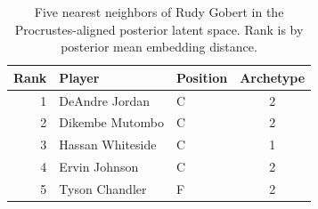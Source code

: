 \begin{table}[htbp]
  \centering\small
  \begin{tabular}{rllc}
    \toprule
    Rank & Player & Position & Archetype \\
    \midrule
    1 & DeAndre Jordan & C & 2 \\
    2 & Dikembe Mutombo & C & 2 \\
    3 & Hassan Whiteside & C & 1 \\
    4 & Ervin Johnson & C & 2 \\
    5 & Tyson Chandler & F & 2 \\
    \bottomrule
  \end{tabular}
  \caption{Five nearest neighbors of Rudy Gobert in the Procrustes-aligned posterior latent space. Rank is by posterior mean embedding distance.}
  \label{tab:Rudy_Gobert_neighbors}
\end{table}


